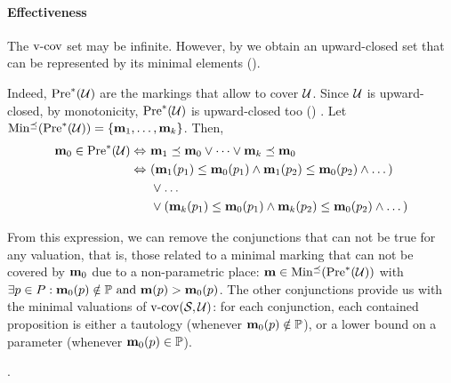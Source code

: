 \paragraph{Effectiveness}
The $\operatorname{v-cov}$ set may be infinite.
However,
by  we obtain an upward-closed set that can be represented by its minimal elements ().

Indeed,
$\operatorname{Pre}^*_{}(\mathcal{U})$ are the markings that allow to cover $\mathcal{U}$.
Since $\mathcal{U}$ is upward-closed, by monotonicity, $\operatorname{Pre}^*_{}(\mathcal{U})$ is upward-closed too () .
Let $\operatorname{Min^\preceq}(\operatorname{Pre}^*_{}(\mathcal{U})) = \{\mathbf{m}_1, \dots, \mathbf{m}_k\}$.
Then,
\begin{align*}
  \mathbf{m}_0 \in \operatorname{Pre}^*_{}(\mathcal{U}) \Leftrightarrow \ &
    \mathbf{m}_1 \preceq \mathbf{m}_0 \vee \dots \vee \mathbf{m}_k \preceq \mathbf{m}_0 \\
  \Leftrightarrow \ &
    (\mathbf{m}_1(p_1) \leq \mathbf{m}_0(p_1) \wedge \mathbf{m}_1(p_2) \leq \mathbf{m}_0(p_2) \wedge \dots) \\
  &\vee \dots \\
  &\vee
    (\mathbf{m}_k(p_1) \leq \mathbf{m}_0(p_1) \wedge \mathbf{m}_k(p_2) \leq \mathbf{m}_0(p_2) \wedge \dots)
\end{align*}

From this expression, we can remove the conjunctions that can not be true for any valuation, that is, those related to a minimal marking that can not be covered by $\mathbf{m}_0$ due to a non-parametric place: $\mathbf{m} \in \operatorname{Min^\preceq}(\operatorname{Pre}^*_{}(\mathcal{U}))$ with
\(
  \exists p \in P : \mathbf{m}_0(p) \notin \mathbb{P} \text{ and } \mathbf{m}(p) > \mathbf{m}_0(p)
\).
The other conjunctions provide us with the minimal valuations of $\operatorname{v-cov}(\mathcal{S}_{{}},\mathcal{U})$:
for each conjunction, each contained proposition is either a tautology (whenever $\mathbf{m}_0(p) \notin \mathbb{P}$), or a lower bound on a parameter (whenever $\mathbf{m}_0(p) \in \mathbb{P}$).

.


